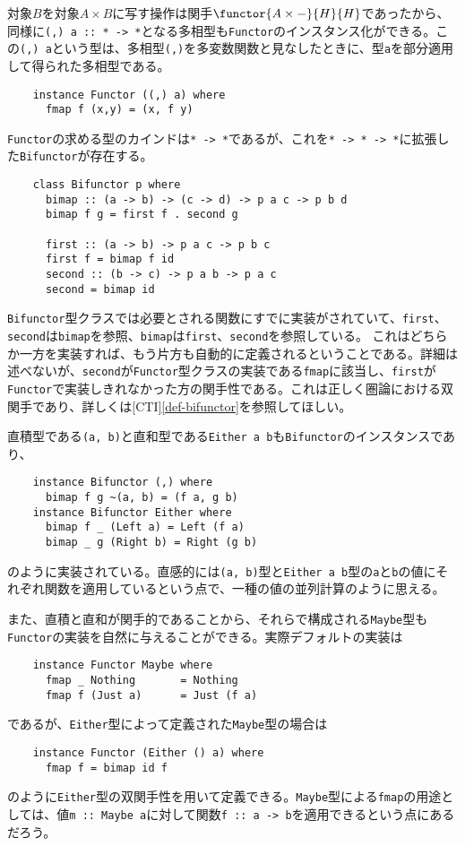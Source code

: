 \documentclass[uplatex,dvipdfmx]{jsarticle}
\newcommand{\pr}[1]{\colorbox[rgb]{0.9,0.9,0.9}{\lstinline{#1}}}
\newcommand{\refcti}[1]{[CTI]\ref{#1}}
\begin{document}
  対象$B$を対象$A\times B$に写す操作は関手$\functor{A \times -}{H}{H}$であったから、同様に\pr{(,) a :: * -> *}となる多相型も\pr{Functor}のインスタンス化ができる。この\pr{(,) a}という型は、多相型\pr{(,)}を多変数関数と見なしたときに、型\pr{a}を部分適用して得られた多相型である。
  \begin{lstlisting}
    instance Functor ((,) a) where
      fmap f (x,y) = (x, f y)
  \end{lstlisting}
  \pr{Functor}の求める型のカインドは\pr{* -> *}であるが、これを\pr{* -> * -> *}に拡張した\pr{Bifunctor}が存在する。
  \begin{lstlisting}
    class Bifunctor p where
      bimap :: (a -> b) -> (c -> d) -> p a c -> p b d
      bimap f g = first f . second g

      first :: (a -> b) -> p a c -> p b c
      first f = bimap f id
      second :: (b -> c) -> p a b -> p a c
      second = bimap id
  \end{lstlisting}
  \pr{Bifunctor}型クラスでは必要とされる関数にすでに実装がされていて、\pr{first}、\pr{second}は\pr{bimap}を参照、\pr{bimap}は\pr{first}、\pr{second}を参照している。
  これはどちらか一方を実装すれば、もう片方も自動的に定義されるということである。詳細は述べないが、\pr{second}が\pr{Functor}型クラスの実装である\pr{fmap}に該当し、\pr{first}が\pr{Functor}で実装しきれなかった方の関手性である。これは正しく圏論における双関手であり、詳しくは\refcti{def-bifunctor}を参照してほしい。
  
  直積型である\pr{(a, b)}と直和型である\pr{Either a b}も\pr{Bifunctor}のインスタンスであり、
  \begin{lstlisting}
    instance Bifunctor (,) where
      bimap f g ~(a, b) = (f a, g b)
    instance Bifunctor Either where
      bimap f _ (Left a) = Left (f a)
      bimap _ g (Right b) = Right (g b)
  \end{lstlisting}
  のように実装されている。直感的には\pr{(a, b)}型と\pr{Either a b}型の\pr{a}と\pr{b}の値にそれぞれ関数を適用しているという点で、一種の値の並列計算のように思える。

  また、直積と直和が関手的であることから、それらで構成される\pr{Maybe}型も\pr{Functor}の実装を自然に与えることができる。実際デフォルトの実装は
  \begin{lstlisting}
    instance Functor Maybe where
      fmap _ Nothing       = Nothing
      fmap f (Just a)      = Just (f a)
  \end{lstlisting}
  であるが、\pr{Either}型によって定義された\pr{Maybe}型の場合は
  \begin{lstlisting}
    instance Functor (Either () a) where
      fmap f = bimap id f
  \end{lstlisting}
  のように\pr{Either}型の双関手性を用いて定義できる。\pr{Maybe}型による\pr{fmap}の用途としては、値\pr{m :: Maybe a}に対して関数\pr{f :: a -> b}を適用できるという点にあるだろう。
  
\end{document}
